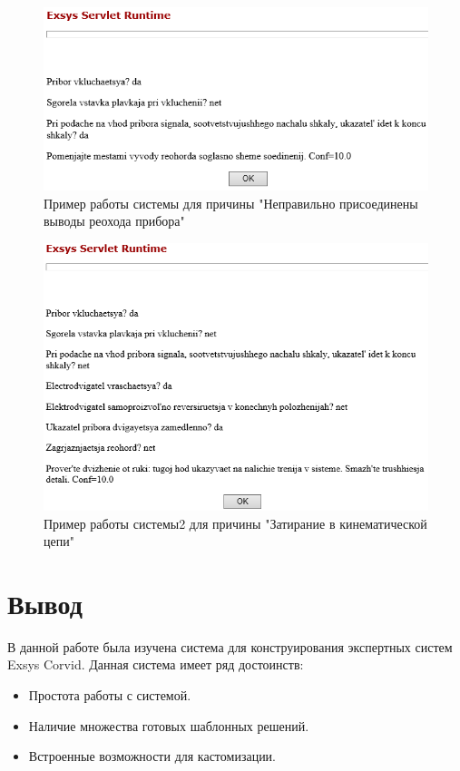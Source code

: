 \documentclass[14pt,a4paper,report]{report}
\begin{document}
\begin{figure}[h!]
	\centering
	\includegraphics[scale = 0.7]{images/7_2.png}
	\caption{Пример работы системы для причины "Неправильно присоединены выводы реохода прибора"}
\end{figure}

\begin{figure}[h!]
	\centering
	\includegraphics[scale = 0.7]{images/7_3.png}
	\caption{Пример работы системы2 для причины "Затирание в кинематической цепи"}
\end{figure}

\section{Вывод}

В данной работе была изучена система для конструирования экспертных систем Exsys Corvid. Данная система имеет ряд достоинств:

\begin{itemize}
	\item Простота работы с системой.
	\item Наличие множества готовых шаблонных решений.
	\item Встроенные возможности для кастомизации.
\end{itemize}
\end{document}
